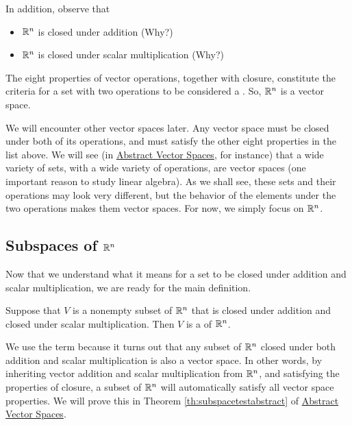 \documentclass{ximera}
\begin{document}
  In addition, observe that  
  \begin{itemize}
      \item[]  $\mathbb{R}^n$ is closed under addition (Why?)
      \item[] $\mathbb{R}^n$ is closed under scalar multiplication (Why?)
\end{itemize}      
      The eight properties of vector operations, together with closure, constitute the criteria for a set with two operations to be considered a . So, $\mathbb{R}^n$ is a vector space.  
      
      We will encounter other vector spaces later. Any vector space must be closed under both of its operations, and must satisfy the other eight properties in the list above.  We will see (in \href{https://ximera.osu.edu/oerlinalg/LinearAlgebra/VSP-0050/main}{Abstract Vector Spaces}, for instance) that a wide variety of sets, with a wide variety of operations, are vector spaces (one important reason to study linear algebra).  As we shall see, these sets and their operations may look very different, but the behavior of the elements under the two operations makes them vector spaces.  For now, we simply focus on $\mathbb{R}^n$.


\subsection*{Subspaces of $\mathbb{R}^n$}

Now that we understand what it means for a set to be closed under addition and scalar multiplication, we are ready for the main definition.

\begin{definition}\label{def:subspace} Suppose that $V$ is a nonempty subset of $\mathbb{R}^n$ that is closed under addition and closed under scalar multiplication.  Then $V$ is a  of $\mathbb{R}^n$.
\end{definition}
We use the term  because it turns out that any subset of $\mathbb{R}^n$ closed under both addition and scalar multiplication is also a vector space.  In other words, by inheriting vector addition and scalar multiplication from $\mathbb{R}^n$, and satisfying the properties of closure, a subset of $\mathbb{R}^n$ will automatically satisfy all vector space properties.  We will prove this in Theorem \ref{th:subspacetestabstract} of \href{https://ximera.osu.edu/oerlinalg/LinearAlgebra/VSP-0050/main}{Abstract Vector Spaces}.
\end{document}
